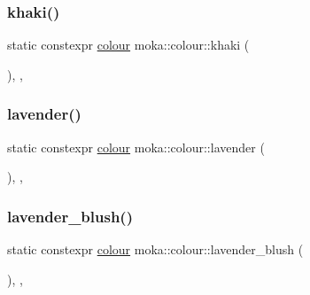 \mbox{\label{classmoka_1_1colour_a1e92a40a2b17059f3687fdb4ad28a903}} 
\subsubsection{\texorpdfstring{khaki()}{khaki()}}
{\footnotesize\ttfamily static constexpr \mbox{\hyperlink{classmoka_1_1colour}{colour}} moka\+::colour\+::khaki (\begin{DoxyParamCaption}{ }\end{DoxyParamCaption})\hspace{0.3cm}{\ttfamily [inline]}, {\ttfamily [static]}, {\ttfamily [noexcept]}}

\mbox{\label{classmoka_1_1colour_a46763102fc27ba8ead1c3b51462d0722}} 
\subsubsection{\texorpdfstring{lavender()}{lavender()}}
{\footnotesize\ttfamily static constexpr \mbox{\hyperlink{classmoka_1_1colour}{colour}} moka\+::colour\+::lavender (\begin{DoxyParamCaption}{ }\end{DoxyParamCaption})\hspace{0.3cm}{\ttfamily [inline]}, {\ttfamily [static]}, {\ttfamily [noexcept]}}

\mbox{\label{classmoka_1_1colour_aa49ab82953f6b5120105bab3c5a7cbb3}} 
\subsubsection{\texorpdfstring{lavender\_blush()}{lavender\_blush()}}
{\footnotesize\ttfamily static constexpr \mbox{\hyperlink{classmoka_1_1colour}{colour}} moka\+::colour\+::lavender\+\_\+blush (\begin{DoxyParamCaption}{ }\end{DoxyParamCaption})\hspace{0.3cm}{\ttfamily [inline]}, {\ttfamily [static]}, {\ttfamily [noexcept]}}

